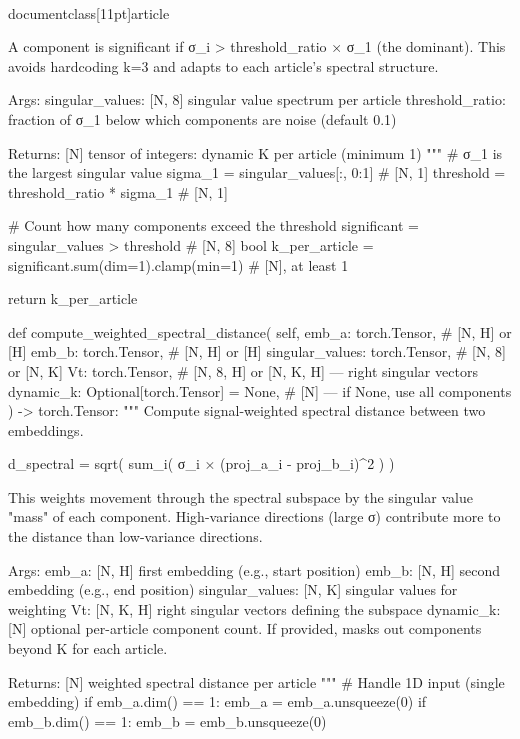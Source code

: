 \\documentclass[11pt]{article}
\begin{document}
\begin{CodeBlock}
        A component is significant if σ_i > threshold_ratio × σ_1 (the dominant).
        This avoids hardcoding k=3 and adapts to each article's spectral structure.

        Args:
            singular_values: [N, 8] singular value spectrum per article
            threshold_ratio: fraction of σ_1 below which components are noise (default 0.1)

        Returns:
            [N] tensor of integers: dynamic K per article (minimum 1)
        """
        # σ_1 is the largest singular value
        sigma_1 = singular_values[:, 0:1]  # [N, 1]
        threshold = threshold_ratio * sigma_1  # [N, 1]

        # Count how many components exceed the threshold
        significant = singular_values > threshold  # [N, 8] bool
        k_per_article = significant.sum(dim=1).clamp(min=1)  # [N], at least 1

        return k_per_article

    def compute_weighted_spectral_distance(
        self,
        emb_a: torch.Tensor,  # [N, H] or [H]
        emb_b: torch.Tensor,  # [N, H] or [H]
        singular_values: torch.Tensor,  # [N, 8] or [N, K]
        Vt: torch.Tensor,  # [N, 8, H] or [N, K, H] — right singular vectors
        dynamic_k: Optional[torch.Tensor] = None,  # [N] — if None, use all components
    ) -> torch.Tensor:
        """
        Compute signal-weighted spectral distance between two embeddings.

        d_spectral = sqrt( sum_i( σ_i × (proj_a_i - proj_b_i)^2 ) )

        This weights movement through the spectral subspace by the singular value
        "mass" of each component. High-variance directions (large σ) contribute
        more to the distance than low-variance directions.

        Args:
            emb_a: [N, H] first embedding (e.g., start position)
            emb_b: [N, H] second embedding (e.g., end position)
            singular_values: [N, K] singular values for weighting
            Vt: [N, K, H] right singular vectors defining the subspace
            dynamic_k: [N] optional per-article component count. If provided,
                       masks out components beyond K for each article.

        Returns:
            [N] weighted spectral distance per article
        """
        # Handle 1D input (single embedding)
        if emb_a.dim() == 1:
            emb_a = emb_a.unsqueeze(0)
        if emb_b.dim() == 1:
            emb_b = emb_b.unsqueeze(0)


\end{CodeBlock}
\end{document}
